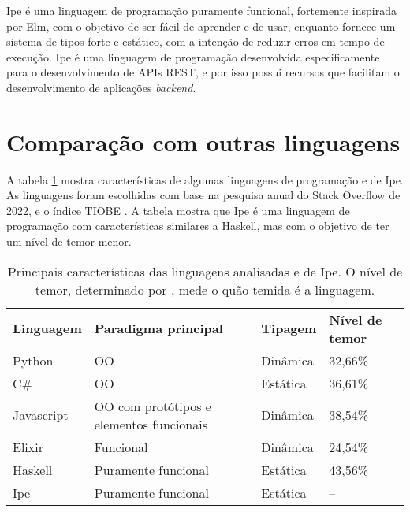 \documentclass[12pt]{article}
\begin{document}
Ipe é uma linguagem de programação puramente funcional, fortemente inspirada por Elm, com o objetivo
de ser fácil de aprender e de usar, enquanto fornece um sistema de tipos forte e estático, com a
intenção de reduzir erros em tempo de execução. Ipe é uma linguagem de programação desenvolvida
especificamente para o desenvolvimento de APIs REST, e por isso possui recursos que facilitam o
desenvolvimento de aplicações \textit{backend}.


\section{Comparação com outras linguagens} \label{sec:comparisons}

A tabela \ref{tab-language-comparisons} mostra características de algumas linguagens de programação
e de Ipe. As linguagens foram escolhidas com base na pesquisa anual do Stack Overflow \cite{stackoverflowsurvey}
de 2022, e o índice TIOBE \cite{tiobeindex}. A tabela mostra que Ipe é uma linguagem de programação
com características similares a Haskell, mas com o objetivo de ter um nível de temor menor.


\begin{table}[htb]
  \caption{Principais características das linguagens analisadas e de Ipe. O nível de temor, determinado por \cite{stackoverflowsurvey}, mede o quão temida é a linguagem.}
  \label{tab-language-comparisons}
  \begin{tabular}{p{2.50cm}p{5.00cm}p{2.50cm}p{3.25cm}}
    \textbf{Linguagem} & \textbf{Paradigma principal}             & \textbf{Tipagem} & \textbf{Nível de temor} \\
    Python             & OO                                       & Dinâmica         & 32,66\%                 \\
    C\#                & OO                                       & Estática         & 36,61\%                 \\
    Javascript         & OO com protótipos e elementos funcionais & Dinâmica         & 38,54\%                 \\
    Elixir             & Funcional                                & Dinâmica         & 24,54\%                 \\
    Haskell            & Puramente funcional                      & Estática         & 43,56\%                 \\
    Ipe                & Puramente funcional                      & Estática         & --                      \\
  \end{tabular}
\end{table}
\end{document}

